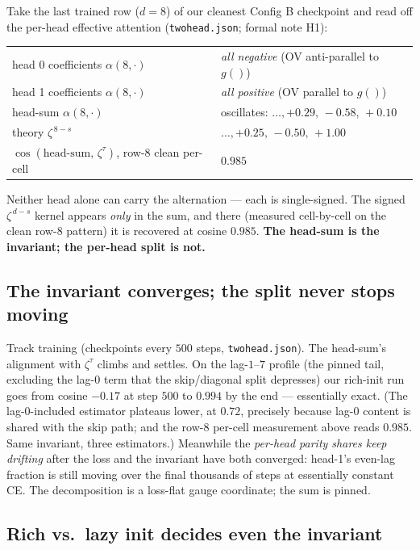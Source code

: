 \documentclass[11pt]{article}
\newcommand{\pzeta}{\zeta}
\newcommand{\gv}[1]{g(#1)}
\begin{document}
Take the last trained row ($d=8$) of our cleanest Config B checkpoint and read
off the per-head effective attention (\texttt{twohead.json}; formal note H1):
\begin{center}
\begin{tabular}{ll}
\toprule
head 0 coefficients $\alpha(8,\cdot)$ & \emph{all negative} (OV anti-parallel to $\gv{}$) \\
head 1 coefficients $\alpha(8,\cdot)$ & \emph{all positive} (OV parallel to $\gv{}$) \\
head-sum $\alpha(8,\cdot)$ & oscillates: $\dots,+0.29,\,-0.58,\,+0.10$ \\
theory $\pzeta^{\,8-s}$ & $\dots,+0.25,\,-0.50,\,+1.00$ \\
\midrule
$\cos(\text{head-sum},\,\pzeta^\tau)$, row-8 clean per-cell & $\mathbf{0.985}$ \\
\bottomrule
\end{tabular}
\end{center}
Neither head alone can carry the alternation --- each is single-signed. The
signed $\pzeta^{\,d-s}$ kernel appears \emph{only} in the sum, and there
(measured cell-by-cell on the clean row-8 pattern) it is recovered at cosine
$0.985$. \textbf{The head-sum is the invariant; the per-head split is not.}

\subsection{The invariant converges; the split never stops moving}

Track training (checkpoints every $500$ steps, \texttt{twohead.json}). The
head-sum's alignment with $\pzeta^\tau$ climbs and settles. On the lag-$1$--$7$
profile (the pinned tail, excluding the lag-0 term that the skip/diagonal split
depresses) our rich-init run goes from cosine $-0.17$ at step $500$ to
$\mathbf{0.994}$ by the end --- essentially exact. (The lag-0-included estimator
plateaus lower, at $0.72$, precisely because lag-0 content is shared with the
skip path; and the row-8 per-cell measurement above reads $0.985$. Same
invariant, three estimators.) Meanwhile the
\emph{per-head parity shares keep drifting} after the loss and the invariant
have both converged: head-1's even-lag fraction is still moving over the final
thousands of steps at essentially constant CE. The decomposition is a loss-flat
gauge coordinate; the sum is pinned.

\subsection{Rich vs.\ lazy init decides even the invariant}
\end{document}
